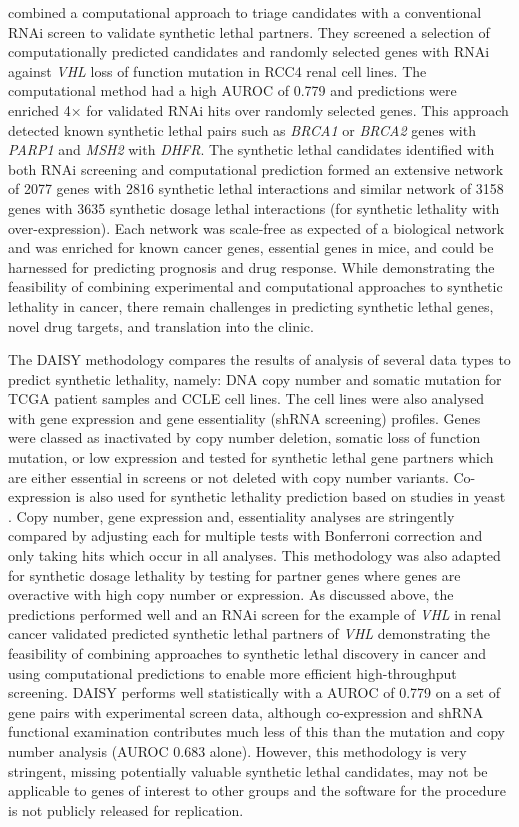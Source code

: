 \citet{Jerby2014} combined a computational approach to triage candidates with a conventional RNAi screen to validate synthetic lethal partners. They screened a selection of computationally predicted candidates and randomly selected genes with RNAi against \textit{VHL} loss of function mutation in RCC4 renal cell lines. The computational method had a high AUROC of 0.779 and predictions were enriched 4$\times$ for validated RNAi hits over randomly selected genes. This approach detected known synthetic lethal pairs such as \textit{BRCA1} or \textit{BRCA2} genes with \textit{PARP1} and \textit{MSH2} with \textit{DHFR}. The synthetic lethal candidates identified with both RNAi screening and computational prediction formed an extensive network of 2077 genes with 2816 synthetic lethal interactions and similar network of 3158 genes with 3635 synthetic dosage lethal interactions (for synthetic lethality with over-expression). Each network was scale-free as expected of a biological network and was enriched for known cancer genes, essential genes in mice, and could be harnessed for predicting prognosis and drug response. While demonstrating the feasibility of combining experimental and computational approaches to synthetic lethality in cancer, there remain challenges in predicting synthetic lethal genes, novel drug targets, and translation into the clinic.  

The DAISY methodology \citep{Jerby2014} compares the results of analysis of several data types to predict synthetic lethality, namely: DNA copy number and somatic mutation for TCGA patient samples and CCLE cell lines. The cell lines were also analysed with gene expression and gene essentiality (shRNA screening) profiles. Genes were classed as inactivated by copy number deletion, somatic loss of function mutation, or low expression and tested for synthetic lethal gene partners which are either essential in screens or not deleted with copy number variants. Co-expression is also used for synthetic lethality prediction based on studies in yeast \citep{Costanzo2010, Kelley2005}. Copy number, gene expression and, essentiality analyses are stringently compared by adjusting each for multiple tests with Bonferroni correction and only taking hits which occur in all analyses. This methodology was also adapted for synthetic dosage lethality by testing for partner genes where genes are overactive with high copy number or expression. As discussed above, the predictions performed well and an RNAi screen for the example of \textit{VHL} in renal cancer validated predicted synthetic lethal partners of \textit{VHL} demonstrating the feasibility of combining approaches to synthetic lethal discovery in cancer and using computational predictions to enable more efficient high-throughput screening. DAISY performs well statistically with a AUROC of 0.779 on a set of gene pairs with experimental screen data, although co-expression and shRNA functional examination contributes much less of this than the mutation and copy number analysis (AUROC 0.683 alone). However, this methodology is very stringent, missing potentially valuable synthetic lethal candidates, may not be applicable to genes of interest to other groups and the software for the procedure is not publicly released for replication.  

